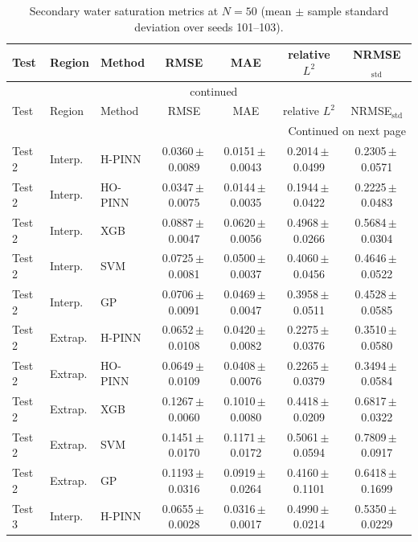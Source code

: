 \begingroup
\footnotesize
\setlength{\tabcolsep}{1.25pt}
\begin{longtable}{lllcccc}
\caption{Secondary water saturation metrics at $N=50$ (mean $\pm$ sample standard deviation over seeds 101--103).}\label{tab:appendix_swat_metrics}\\
\toprule
Test & Region & Method & RMSE & MAE & relative $L^2$ & NRMSE$_{\mathrm{std}}$ \\
\midrule
\endfirsthead
\multicolumn{7}{c}{\tablename~\thetable{} continued} \\
\toprule
Test & Region & Method & RMSE & MAE & relative $L^2$ & NRMSE$_{\mathrm{std}}$ \\
\midrule
\endhead
\midrule
\multicolumn{7}{r}{Continued on next page} \\
\endfoot
\bottomrule
\endlastfoot
Test 2 & Interp. & H-PINN & 0.0360\,$\pm$\,0.0089 & 0.0151\,$\pm$\,0.0043 & 0.2014\,$\pm$\,0.0499 & 0.2305\,$\pm$\,0.0571 \\
Test 2 & Interp. & HO-PINN & 0.0347\,$\pm$\,0.0075 & 0.0144\,$\pm$\,0.0035 & 0.1944\,$\pm$\,0.0422 & 0.2225\,$\pm$\,0.0483 \\
Test 2 & Interp. & XGB & 0.0887\,$\pm$\,0.0047 & 0.0620\,$\pm$\,0.0056 & 0.4968\,$\pm$\,0.0266 & 0.5684\,$\pm$\,0.0304 \\
Test 2 & Interp. & SVM & 0.0725\,$\pm$\,0.0081 & 0.0500\,$\pm$\,0.0037 & 0.4060\,$\pm$\,0.0456 & 0.4646\,$\pm$\,0.0522 \\
Test 2 & Interp. & GP & 0.0706\,$\pm$\,0.0091 & 0.0469\,$\pm$\,0.0047 & 0.3958\,$\pm$\,0.0511 & 0.4528\,$\pm$\,0.0585 \\
\addlinespace[2pt]
Test 2 & Extrap. & H-PINN & 0.0652\,$\pm$\,0.0108 & 0.0420\,$\pm$\,0.0082 & 0.2275\,$\pm$\,0.0376 & 0.3510\,$\pm$\,0.0580 \\
Test 2 & Extrap. & HO-PINN & 0.0649\,$\pm$\,0.0109 & 0.0408\,$\pm$\,0.0076 & 0.2265\,$\pm$\,0.0379 & 0.3494\,$\pm$\,0.0584 \\
Test 2 & Extrap. & XGB & 0.1267\,$\pm$\,0.0060 & 0.1010\,$\pm$\,0.0080 & 0.4418\,$\pm$\,0.0209 & 0.6817\,$\pm$\,0.0322 \\
Test 2 & Extrap. & SVM & 0.1451\,$\pm$\,0.0170 & 0.1171\,$\pm$\,0.0172 & 0.5061\,$\pm$\,0.0594 & 0.7809\,$\pm$\,0.0917 \\
Test 2 & Extrap. & GP & 0.1193\,$\pm$\,0.0316 & 0.0919\,$\pm$\,0.0264 & 0.4160\,$\pm$\,0.1101 & 0.6418\,$\pm$\,0.1699 \\
\addlinespace[2pt]
Test 3 & Interp. & H-PINN & 0.0655\,$\pm$\,0.0028 & 0.0316\,$\pm$\,0.0017 & 0.4990\,$\pm$\,0.0214 & 0.5350\,$\pm$\,0.0229 \\

\end{longtable}
